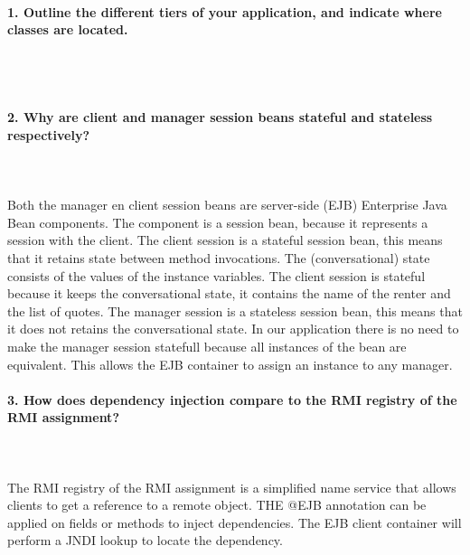 \documentclass{ds-report}
\begin{document}
	\maketitle

	\paragraph{1. Outline the different tiers of your application, and indicate where classes are located.} \mbox{}\\\\




	
	\paragraph{2. Why are client and manager session beans stateful and stateless respectively?} \mbox{}\\\\

Both the manager en client session beans are server-side (EJB) Enterprise Java Bean components. The component is a session bean, because it represents a session with the client.
The client session is a stateful session bean, this means that it retains state between method invocations. The (conversational) state consists of the values of the instance variables. The client session is stateful because it keeps the conversational state, it contains the name of the renter and the list of quotes.
The manager session is a stateless session bean, this means that it does not retains the conversational state. In our application there is no need to make the manager session statefull because all instances of the bean are equivalent. This allows the EJB container to assign an instance to any manager.



	\paragraph{3. How does dependency injection compare to the RMI registry of the RMI assignment?} \mbox{}\\\\
The RMI registry of the RMI assignment is a simplified name service that allows clients to get a reference to a remote object. THE @EJB annotation can be applied on fields or methods to inject dependencies. The EJB client container will perform a JNDI lookup to locate the dependency.
\end{document}
